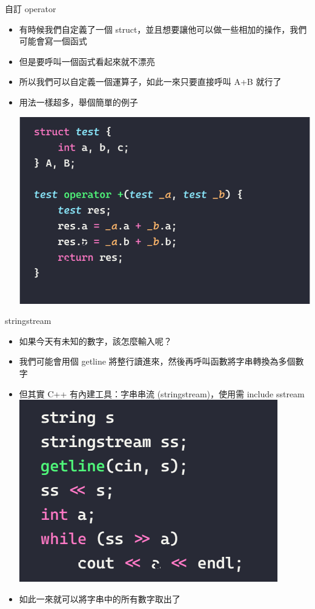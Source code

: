 \documentclass[aspectratio=169]{beamer}
\begin{document}
	\begin{frame}{自訂 operator}
		\begin{itemize}
			\item<1-> 有時候我們自定義了一個 struct，並且想要讓他可以做一些相加的操作，我們可能會寫一個函式
			\item<2-> 但是要呼叫一個函式看起來就不漂亮
			\item<3-> 所以我們可以自定義一個運算子，如此一來只要直接呼叫 A+B 就行了
			\item<4-> 用法一樣超多，舉個簡單的例子
			\begin{center}
				\includegraphics[height=0.5\textheight]{src/operator_1.png}\\
			\end{center}
		\end{itemize}
	\end{frame}

	\begin{frame}{stringstream}
		\begin{itemize}
			\item<1-> 如果今天有未知的數字，該怎麼輸入呢？
			\item<2-> 我們可能會用個 getline 將整行讀進來，然後再呼叫函數將字串轉換為多個數字
			\item<3-> 但其實 C++ 有內建工具：字串串流 (stringstream)，使用需 include sstream
			\includegraphics[height=0.3\textheight]{./src/sstream_1.png}
			\item<4-> 如此一來就可以將字串中的所有數字取出了
		\end{itemize}
	\end{frame}
\end{document}

